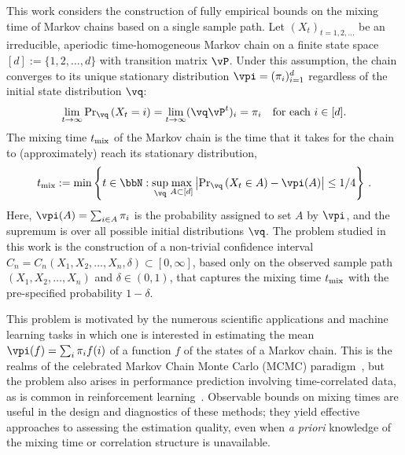 

This work considers the construction of fully empirical bounds on the
mixing time of Markov chains based on a single sample path.
Let $(X_t)_{t=1,2,\dotsc}$ be an irreducible, aperiodic
time-homogeneous Markov chain on a finite state space $[d] :=
\{1,2,\dotsc,d\}$ with transition matrix $\vP$.
Under this assumption, the chain converges to its unique stationary
 distribution $\vpi =
(\pi_i)_{i=1}^d$ regardless of the initial state distribution $\vq$: 
\[
  \lim_{t\to\infty} {\Pr}_{\vq}\Parens{X_t = i}
  = \lim_{t\to\infty} (\vq \vP^t)_i = \pi_i
  \quad \text{for each $i \in [d]$} .
\]
The mixing time $t_{\operatorname{mix}}$ of the Markov chain is the time that it takes
for the chain to (approximately) reach its stationary distribution,
\[
  \tmix
  :=
  \min\Braces{
    t \in \bbN :
    \sup_{\vq}
    \max_{A\subset [d]}
    \Abs{
      \textstyle\Pr_{\vq}\Parens{ X_t \in A } - \vpi(A)
    }
    \leq 1/4
  }\,.
\]
Here, $\vpi(A) = \sum_{i\in A} \pi_i$ is the probability assigned to
set $A$ by $\vpi$, and the supremum is over all possible initial
distributions $\vq$.
The problem studied in this work is the construction of a non-trivial
confidence interval $C_n = C_n(X_1,X_2,\dotsc,X_n,\delta) \subset
[0,\infty]$, based only on the observed sample path
$(X_1,X_2,\dotsc,X_n)$ and $\delta \in (0,1)$, that captures the
mixing time $t_{\operatorname{mix}}$ with the pre-specified probability $1-\delta$. 

This problem is motivated by the numerous scientific applications and
machine learning tasks in which one is interested in estimating the
mean $\vpi(f) = \sum_i \pi_i f(i)$ of a function $f$ of the states of
a Markov chain.
This is the realms of the celebrated Markov Chain Monte Carlo (MCMC)
paradigm~\cite{liu2001monte}, but the problem also arises in
performance prediction involving time-correlated data, as is common in
reinforcement learning~\cite{sutton98}.
Observable bounds on mixing times are useful in the design and
diagnostics of these methods; they yield effective approaches to
assessing the estimation quality, even when \emph{a priori} knowledge
of the mixing time or correlation structure is unavailable.

